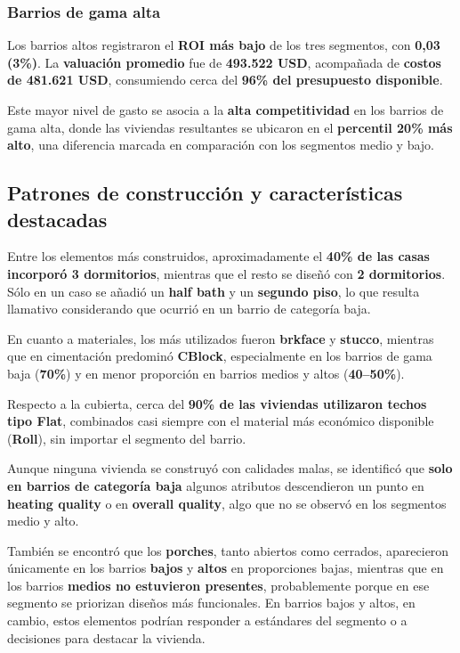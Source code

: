 \subsubsection{Barrios de gama alta}

Los barrios altos registraron el \textbf{ROI más bajo} de los tres segmentos, con \textbf{0{,}03 (3\%)}. La \textbf{valuación promedio} fue de \textbf{493.522 USD}, acompañada de \textbf{costos de 481.621 USD}, consumiendo cerca del \textbf{96\% del presupuesto disponible}.

Este mayor nivel de gasto se asocia a la \textbf{alta competitividad} en los barrios de gama alta, donde las viviendas resultantes se ubicaron en el \textbf{percentil 20\% más alto}, una diferencia marcada en comparación con los segmentos medio y bajo.

\subsection{Patrones de construcción y características destacadas}

Entre los elementos más construidos, aproximadamente el \textbf{40\% de las casas incorporó 3 dormitorios}, mientras que el resto se diseñó con \textbf{2 dormitorios}. Sólo en un caso se añadió un \textbf{half bath} y un \textbf{segundo piso}, lo que resulta llamativo considerando que ocurrió en un barrio de categoría baja.

En cuanto a materiales, los más utilizados fueron \textbf{brkface} y \textbf{stucco}, mientras que en cimentación predominó \textbf{CBlock}, especialmente en los barrios de gama baja (\textbf{70\%}) y en menor proporción en barrios medios y altos (\textbf{40--50\%}).

Respecto a la cubierta, cerca del \textbf{90\% de las viviendas utilizaron techos tipo Flat}, combinados casi siempre con el material más económico disponible (\textbf{Roll}), sin importar el segmento del barrio.

Aunque ninguna vivienda se construyó con calidades malas, se identificó que \textbf{solo en barrios de categoría baja} algunos atributos descendieron un punto en \textbf{heating quality} o en \textbf{overall quality}, algo que no se observó en los segmentos medio y alto.

También se encontró que los \textbf{porches}, tanto abiertos como cerrados, aparecieron únicamente en los barrios \textbf{bajos} y \textbf{altos} en proporciones bajas, mientras que en los barrios \textbf{medios no estuvieron presentes}, probablemente porque en ese segmento se priorizan diseños más funcionales. En barrios bajos y altos, en cambio, estos elementos podrían responder a estándares del segmento o a decisiones para destacar la vivienda.

